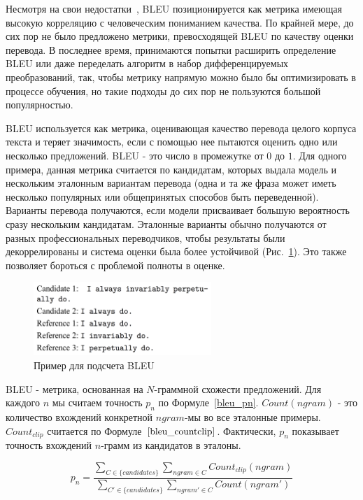 \documentclass{spbau-diploma}
\begin{document}
Несмотря на свои недостатки~\cite{bleu_critique}, BLEU позиционируется как 
метрика имеющая высокую корреляцию с человеческим пониманием качества. По 
крайней мере, до сих пор не было предложено метрики, превосходящей BLEU по 
качеству оценки перевода. В последнее время, принимаются попытки расширить 
определение BLEU или даже переделать алгоритм в набор дифференцируемых
преобразований, так, чтобы метрику напрямую можно было бы оптимизировать в 
процессе обучения, но такие подходы до сих пор не пользуются большой 
популярностью.

BLEU используется как метрика, оценивающая качество перевода целого корпуса 
текста и теряет значимость, если с помощью нее пытаются оценить одно или
несколько предложений. BLEU - это число в промежутке от $0$ до $1$. Для 
одного примера, данная метрика считается по кандидатам, которых выдала модель 
и нескольким эталонным вариантам перевода (одна и та же фраза может иметь 
несколько популярных или общепринятых способов быть переведенной). 
Варианты перевода получаются, если модели присваивает большую вероятность сразу 
нескольким кандидатам. 
Эталонные варианты обычно получаются от разных профессиональных переводчиков, 
чтобы результаты были декоррелированы и система оценки была более устойчивой 
(Рис.~\ref{bleu_example}). Это также позволяет бороться с проблемой
полноты в оценке.

\begin{figure}[H]
\centering
\includegraphics[width=0.6\textwidth]{images/bleu_example.png}
\caption{Пример для подсчета BLEU}
\label{bleu_example}
\end{figure}

BLEU - метрика, основанная на $N$-граммной схожести предложений. Для каждого $n$
мы считаем точность $p_n$ по Формуле~\ref{bleu_pn}. $Count(ngram)$ - это 
количество вхождений конкретной $ngram$-мы во все эталонные примеры. 
$Count_{clip}$ считается по Формуле~$\ref{bleu_countclip}$. Фактически, $p_n$
показывает точность вхождений $n$-грамм из кандидатов в эталоны.

\begin{equation}
\label{bleu_pn}
p_n = \frac{\sum\limits_{C \in \{candidates\}}{\sum\limits_{ngram \in C}{Count_{clip}(ngram)}}}{\sum\limits_{C' \in \{candidates\}}{\sum\limits_{ngram' \in C}{Count(ngram')}}}
\end{equation}
\end{document}
